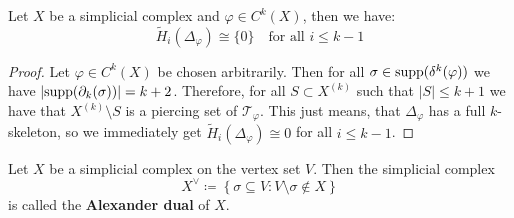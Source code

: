 

%      

\begin{thm}
Let \(X\) be a simplicial complex and \(\varphi\in C^k(X)\), then we have:
\[
\tilde{H}_i(\Delta_{\varphi})\cong\{0\}\quad\text{for all }i\leq k-1
\]
\begin{proof}
Let \(\varphi\in C^k(X)\) be chosen arbitrarily. Then for all \(\sigma\in \mathrm{supp}(\delta^k(\varphi))\) we have \(\left|\mathrm{supp}(\partial_k(\sigma))\right|=k+2\). Therefore, for all \(S\subset X^{(k)}\) such that \(\left|S\right|\leq k+1\) we have that \(X^{(k)}\setminus S\) is a piercing set of \(\mathcal{T}_{\varphi}\). This just means, that \(\Delta_{\varphi}\) has a full \(k\)-skeleton, so we immediately get \(\tilde{H}_i(\Delta_{\varphi})\cong 0\) for all \(i\leq k-1\).
\end{proof}
\end{thm}

\begin{defi}
Let \(X\) be a simplicial complex on the vertex set \(V\). Then the simplicial complex
\[
X^{\lor}\coloneqq \left\{\sigma\subseteq V:V\setminus\sigma\notin X\right\}
\]
is called the \textbf{Alexander dual} of \(X\).
\end{defi}

